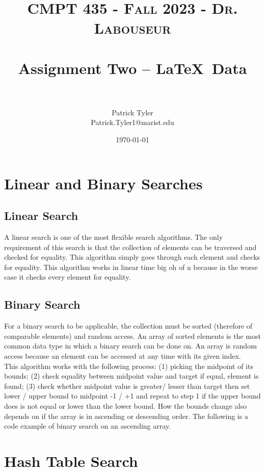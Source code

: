 \documentclass[letterpaper, 10pt]{article}
\title{	
   \normalfont \normalsize 
   \textsc{CMPT 435 - Fall 2023 - Dr. Labouseur} \\[10pt] %
   \horrule{0.5pt} \\[0.25cm] 	%
   \huge Assignment Two -- \LaTeX ~Data\\     	    %
   \horrule{0.5pt} \\[0.25cm] 	%
}
\author{Patrick Tyler \\ \normalsize Patrick.Tyler1@marist.edu}
\date{\normalsize\today} 	%
\begin{document}
\maketitle %


\section{Linear and Binary Searches}
\subsection{Linear Search}
A linear search is one of the most flexible search algorithms. The only requirement of this search is that
the collection of elements can be traversed and checked for equality. This algorithm simply goes through
each element and checks for equality. This algorithm works in linear time big oh of n because in the worse
case it checks every element for equality.
\subsection{Binary Search}
For a binary search to be applicable, the collection must be sorted (therefore of comparable elements)
and random access. An array of sorted elements is the most common data type in which a binary search
can be done on. An array is random access because an element can be accessed at any time with its
given index.\\
\newline
This algorithm works with the following process: (1) picking the midpoint of its bounds;
(2) check equality between midpoint value and target if equal, element is found;
(3) check whether midpoint value is greater/ lesser than target then set lower / upper bound to
midpoint -1 / +1 and repeat to step 1 if the upper bound does is not equal or lower than the lower bound. 
How the bounds change also depends on if the array is in ascending or descending order.
The following is a code example of binary search on an ascending array.
\section{Hash Table Search}
\end{document}
